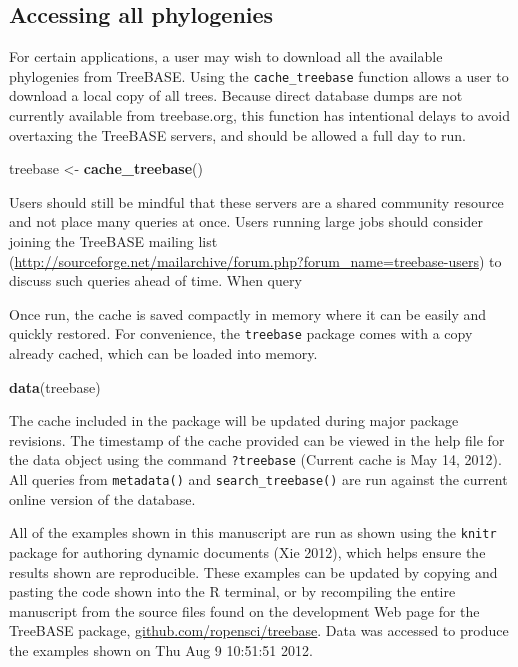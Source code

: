 \documentclass[author-year, 8pt, 3p]{elsarticle} %
\newenvironment{Shaded}{}{}
\newcommand{\KeywordTok}[1]{\textcolor[rgb]{0.00,0.44,0.13}{\textbf{{#1}}}}
\newcommand{\NormalTok}[1]{{#1}}
\begin{document}
\subsection{Accessing all phylogenies}

For certain applications, a user may wish to download all the available
phylogenies from TreeBASE. Using the \texttt{cache\_treebase} function
allows a user to download a local copy of all trees. Because direct
database dumps are not currently available from treebase.org, this
function has intentional delays to avoid overtaxing the TreeBASE
servers, and should be allowed a full day to run.

\begin{Shaded}
\begin{Highlighting}[]
\NormalTok{treebase <- }\KeywordTok{cache_treebase}\NormalTok{()}
\end{Highlighting}
\end{Shaded}
Users should still be mindful that these servers are a shared community
resource and not place many queries at once. Users running large jobs
should consider joining the TreeBASE mailing list
(\href{http://sourceforge.net/mailarchive/forum.php?forum\_name=treebase-users}{http://sourceforge.net/mailarchive/forum.php?forum\_name=treebase-users})
to discuss such queries ahead of time. When query

Once run, the cache is saved compactly in memory where it can be easily
and quickly restored. For convenience, the \texttt{treebase} package
comes with a copy already cached, which can be loaded into memory.

\begin{Shaded}
\begin{Highlighting}[]
\KeywordTok{data}\NormalTok{(treebase)}
\end{Highlighting}
\end{Shaded}
The cache included in the package will be updated during major package
revisions. The timestamp of the cache provided can be viewed in the help
file for the data object using the command \texttt{?treebase} (Current
cache is May 14, 2012). All queries from \texttt{metadata()} and
\texttt{search\_treebase()} are run against the current online version
of the database.

All of the examples shown in this manuscript are run as shown using the
\texttt{knitr} package for authoring dynamic documents (Xie 2012), which
helps ensure the results shown are reproducible. These examples can be
updated by copying and pasting the code shown into the R terminal, or by
recompiling the entire manuscript from the source files found on the
development Web page for the TreeBASE package,
\href{https://github.com/ropensci/treebase}{github.com/ropensci/treebase}.
Data was accessed to produce the examples shown on Thu Aug 9 10:51:51
2012.
\end{document}
